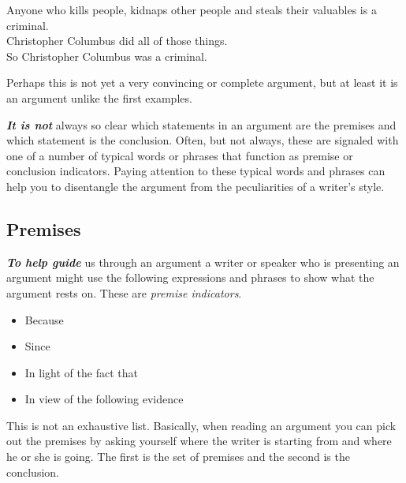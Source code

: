 \documentclass[
  12pt, openany]{book}
\makeatletter
\providecommand{\tightlist}{%
  \setlength{\itemsep}{0pt}\setlength{\parskip}{0pt}}
\newenvironment{kframe}{%
\medskip{}
\setlength{\fboxsep}{.8em}
 \def\at@end@of@kframe{}%
 \ifinner\ifhmode%
  \def\at@end@of@kframe{\end{minipage}}%
  \begin{minipage}{\columnwidth}%
 \fi\fi%
 \def\FrameCommand##1{\hskip\@totalleftmargin \hskip-\fboxsep
 \colorbox{shadecolor}{##1}\hskip-\fboxsep
     \hskip-\linewidth \hskip-\@totalleftmargin \hskip\columnwidth}%
 \MakeFramed {\advance\hsize-\width
   \@totalleftmargin\z@ \linewidth\hsize
   \@setminipage}}%
 {\par\unskip\endMakeFramed%
 \at@end@of@kframe}
\newenvironment{rmdblock}[1]
  {
  \begin{itemize}
  \renewcommand{\labelitemi}{
    \raisebox{-.7\height}[0pt][0pt]{
      {\setkeys{Gin}{width=3em,keepaspectratio}\texttt{[image: img/\#1]}}
    }
  }
  \setlength{\fboxsep}{1em}
  \begin{kframe}
  \item
  }
  {
  \end{kframe}
  \end{itemize}
  }
\newenvironment{note}
  {\begin{rmdblock}{note}}
  {\end{rmdblock}}
\makeatother
\begin{document}
\begin{center}

\begin{argument}

Anyone who kills people, kidnaps other people and steals their valuables is a criminal.\\
Christopher Columbus did all of those things.\\

So Christopher Columbus was a criminal.

\end{argument}

\end{center}

Perhaps this is not yet a very convincing or complete argument, but at least it is an argument unlike the first examples.

\textbf{\emph{It is not}} always so clear which statements in an argument are the premises and which statement is the conclusion. Often, but not always, these are signaled with one of a number of typical words or phrases that function as premise or conclusion indicators. Paying attention to these typical words and phrases can help you to disentangle the argument from the peculiarities of a writer's style.

\hypertarget{premises}{%
\subsection*{Premises}\label{premises}}


\textbf{\emph{To help guide}} us through an argument a writer or speaker who is presenting an argument might use the following expressions and phrases to show what the argument rests on. These are \emph{premise indicators}.

\begin{note}

\begin{itemize}
\tightlist
\item
  Because
\item
  Since
\item
  In light of the fact that
\item
  In view of the following evidence
\end{itemize}

\end{note}

This is not an exhaustive list. Basically, when reading an argument you can pick out the premises by asking yourself where the writer is starting from and where he or she is going. The first is the set of premises and the second is the conclusion.
\end{document}
